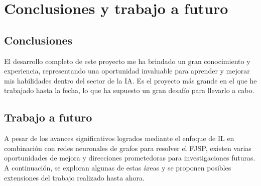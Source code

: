 \section{Conclusiones y trabajo a futuro}
\subsection{Conclusiones}
El desarrollo completo de este proyecto me ha brindado un gran conocimiento 
y experiencia, representando una oportunidad invaluable para aprender y mejorar 
mis habilidades dentro del sector de la IA. Es el proyecto más grande en el que 
he trabajado hasta la fecha, lo que ha supuesto un gran desafío para llevarlo a cabo. 

\subsection{Trabajo a futuro}
A pesar de los avances significativos logrados mediante el enfoque de 
IL en combinación con redes neuronales de grafos para resolver el FJSP, 
existen varias oportunidades de mejora y direcciones prometedoras para 
investigaciones futuras. A continuación, se exploran algunas de estas 
áreas y se proponen posibles extensiones del trabajo realizado hasta ahora.

